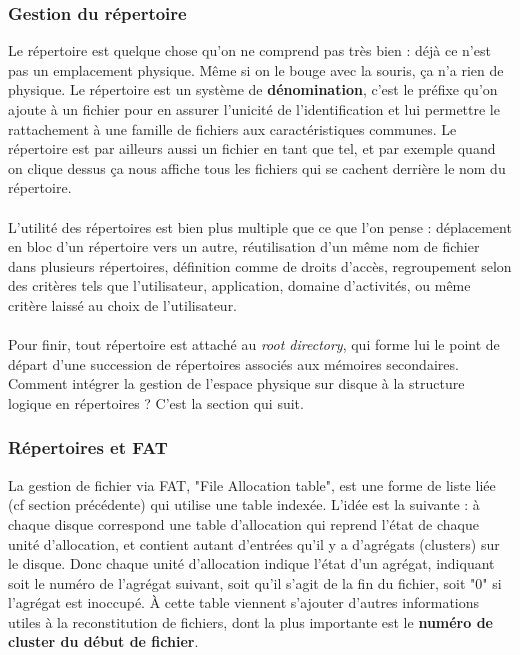 \documentclass[12pt,a4paper]{report}
\begin{document}
\subsubsection{Gestion du répertoire}
Le répertoire est quelque chose qu'on ne comprend pas très bien : déjà ce n'est pas un emplacement physique. Même si on le bouge avec la souris, ça n'a rien de physique. Le répertoire est un système de \textbf{dénomination}, c'est le préfixe qu'on ajoute à un fichier pour en assurer l'unicité de l'identification et lui permettre le rattachement à une famille de fichiers aux caractéristiques communes. Le répertoire est par ailleurs aussi un fichier en tant que tel, et par exemple quand on clique dessus ça nous affiche tous les fichiers qui se cachent derrière le nom du répertoire.\\
\\
L'utilité des répertoires est bien plus multiple que ce que l'on pense : déplacement en bloc d'un répertoire vers un autre, réutilisation d'un même nom de fichier dans plusieurs répertoires, définition comme de droits d'accès, regroupement selon des critères tels que l'utilisateur, application, domaine d'activités, ou même critère laissé au choix de l'utilisateur. \\
\\
Pour finir, tout répertoire est attaché au \textit{root directory}, qui forme lui le point de départ d'une succession de répertoires associés aux mémoires secondaires. Comment intégrer la gestion de l'espace physique sur disque à la structure logique en répertoires ? C'est la section qui suit.

\subsubsection{Répertoires et FAT}
La gestion de fichier via FAT, "File Allocation table", est une forme de liste liée (cf section précédente) qui utilise une table indexée. L'idée est la suivante : à chaque disque correspond une table d'allocation qui reprend l'état de chaque unité d'allocation, et contient autant d'entrées qu'il y a d'agrégats (clusters) sur le disque. Donc chaque unité d'allocation indique l'état d'un agrégat, indiquant soit le numéro de l'agrégat suivant, soit qu'il s'agit de la fin du fichier, soit "0" si l'agrégat est inoccupé. À cette table viennent s'ajouter d'autres informations utiles à la reconstitution de fichiers, dont la plus importante est le \textbf{numéro de cluster du début de fichier}.
\end{document}
